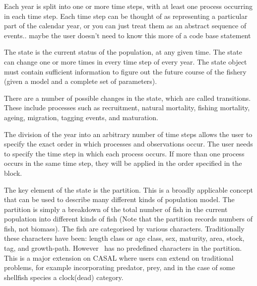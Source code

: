 Each year is split into one or more time steps, with at least one process occurring in each time step. Each time step can be thought of as representing a particular part of the calendar year, or you can just treat them as an abstract sequence of events.. maybe the user doesn't need to know this more of a code base statement

The state is the current status of the population, at any given time. The state can change one or more times in every time step of every year. The state object must contain sufficient information to figure out the future course of the fishery (given a model and a complete set of parameters).

There are a number of possible changes in the state, which are called transitions. These include processes such as recruitment, natural mortality, fishing mortality, ageing, migration, tagging events, and maturation.

The division of the year into an arbitrary number of time steps allows the user to specify the exact order in which processes and observations occur. The user needs to specify the time step in which each process occurs. If more than one process occurs in the same time step, they will be applied in the order specified in the  block.

The key element of the state is the partition. This is a broadly applicable concept that can be used to describe many different kinds of population model. The partition is simply a breakdown of the total number of fish in the current population into different kinds of fish (Note that the partition records numbers of fish, not biomass). The fish are categorised by various characters. Traditionally these characters have been: length class or age class, sex, maturity, area, stock, tag, and growth-path. However \CNAME\ has no predefined characters in the partition. This is a major extension on CASAL where users can extend on traditional problems, for example incorporating predator, prey, and in the case of some shellfish species a clock(dead) category. 


